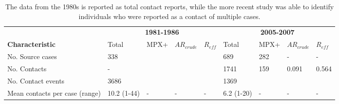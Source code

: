 \begin{table} %
\centering %
\caption{The data from the 1980s is reported as total contact reports, while the more recent study was able to identify individuals who were reported as a contact of multiple cases.} %
\begin{tabular}{p{3.2cm}p{1.1cm}p{1cm}p{1cm}p{1.1cm}p{1.1cm}p{1cm}p{1cm}p{1.1cm}} %
\toprule %
& \multicolumn{4}{c}{\textbf{1981-1986}} & \multicolumn{4}{c}{\textbf{2005-2007}}\\ %
\cmidrule(l){2-5} \cmidrule(l){6-9} %

\textbf{Characteristic} & Total & MPX+ & $AR_{crude}$ & $R_{eff}$ & Total & MPX+ & $AR_{crude}$ & $R_{eff}$ \\ %
\midrule %
No. Source cases & 338 & & & & 689 & 282 & - & - \\ %
No. Contacts & - & & & & 1741 & 159 & 0.091 & 0.564 \\ %
No. Contact events & 3686 & & & & 1369 & & & \\ [0.1cm]
Mean contacts per case (range) & 10.2 (1-44) & - & - & - & 6.2 (1-20) & - & - & - \\ 
\bottomrule %
\end{tabular}
\end{table}

